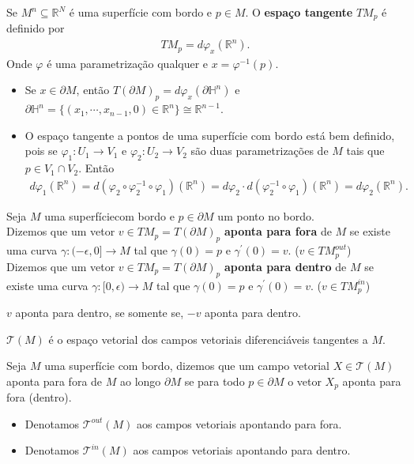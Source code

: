 \begin{definition}
  Se $M^{n}\subseteq\mathbb{R}^{N}$ é uma superfície com bordo e $p\in M$. O \textbf{espaço tangente} $TM_p$ é definido por
  \begin{align*}
    TM_p=d\varphi_x(\mathbb{R}^{n}).
  \end{align*}
  Onde $\varphi$ é uma parametrização qualquer e $x=\varphi^{-1}(p)$. 
\end{definition}
\begin{note}
  \phantom{x}
  \begin{itemize}
    \item Se $x\in\partial M$, então $T(\partial M)_p=d\varphi_x(\partial\mathbb{H}^{n})$ e $\partial\mathbb{H}^{n}=\{(x_1,\cdots,x_{n-1},0)\in\mathbb{R}^{n}\}\cong \mathbb{R}^{n-1}$.
    \item O espaço tangente a pontos de uma superfície com bordo está bem definido, pois se $\varphi_1:U_1\to V_1$ e $\varphi_2:U_2\to V_2$ são duas parametrizações de $M$ tais que $p\in V_1\cap V_2$. Então
      \begin{align*}
        d\varphi_1(\mathbb{R}^{n})=d(\varphi_2\circ\varphi_2^{-1}\circ\varphi_1)(\mathbb{R}^{n})=d\varphi_2\cdot d(\varphi_2^{-1}\circ\varphi_1)(\mathbb{R}^{n})=d\varphi_2(\mathbb{R}^{n}).
      \end{align*}    
  \end{itemize}
\end{note}
\begin{definition}
  Seja $M$ uma superfíciecom bordo e $p\in\partial M$ um ponto no bordo.\\
  Dizemos que um vetor $v\in TM_p=T(\partial M)_p$ \textbf{aponta para fora} de $M$ se existe uma curva $\gamma:(-\epsilon,0]\to M$ tal que $\gamma(0)=p$ e $\gamma^{\prime}(0)=v$. ($v\in TM_p^{out}$)\\
  Dizemos que um vetor $v\in TM_p=T(\partial M)_p$ \textbf{aponta para dentro} de $M$ se existe uma curva $\gamma:[0,\epsilon)\to M$ tal que $\gamma(0)=p$ e $\gamma^{\prime}(0)=v$. ($v\in TM_p^{in}$)\\
\end{definition}
\begin{note}
  $v$ aponta para dentro, se somente se, $-v$ aponta para dentro. 
\end{note}
\begin{notation}
  $\mathcal{T}(M)$ é o espaço vetorial dos campos vetoriais diferenciáveis tangentes a $M$. 
\end{notation}
\begin{definition}
  Seja $M$ uma superfície com bordo, dizemos que um campo vetorial $X\in\mathcal{T}(M)$ aponta para fora de $M$ ao longo $\partial M$ se para todo $p\in\partial M$ o vetor $X_p$ aponta para fora (dentro).
  \begin{itemize}
    \item Denotamos $\mathcal{T}^{out}(M)$ aos campos vetoriais apontando para fora. 
    \item Denotamos $\mathcal{T}^{in}(M)$ aos campos vetoriais apontando para dentro. 
  \end{itemize}
\end{definition}

